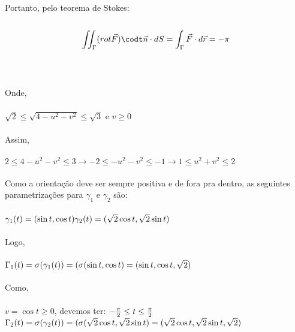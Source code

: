 \documentclass[11pt,a4paper]{article}
\newcommand{\integral}{\displaystyle\int}
\begin{document}
\begin{enumerate}
{{		                Portanto, pelo teorema de Stokes:\\\\
		                $$\iint_{\Gamma} (rot \vec{F})\codt \vec{n} \cdot dS = \integral_{\Gamma} \vec{F} \cdot d\vec{r} = -\pi$$\\\\
		                \item Onde,\\\\
		                $\sqrt{2} \leq \sqrt{4-u^2 - v^2} \leq \sqrt{3}$ e $v \geq 0$\\\\
		                Assim, \\\\
		                $2 \leq 4 - u^2 - v^2 \leq 3 \rightarrow -2\leq -u^2 -v^2 \leq -1 \rightarrow 1 \leq u^2 + v^2 \leq 2$\\\\
		                Como a orientação deve ser sempre positiva e de fora pra dentro, as seguintes parametrizações para $\gamma_{1}$ e $\gamma_{2}$ são:\\\\
		                $\gamma_{1}(t) = (\sin t,\cos t)\\\\
		                \gamma_{2}(t) = (\sqrt{2}\cos t,\sqrt{2}\sin t)$\\\\
		                Logo,\\\\
		                $\Gamma_{1}(t) = \sigma(\gamma_{1}(t))\\\\
		                =(\sigma(\sin t,\cos t)\\\\
		                =(\sin t,\cos t,\sqrt{2})$\\\\
		                Como,\\\\
		                $v = \cos t \geq 0$, devemos ter: $-\frac{\pi}{2} \leq t \leq \frac{\pi}{2}\\\\$
		                $\Gamma_{2}(t) = \sigma(\gamma_{2}(t))\\\\
		                =(\sigma(\sqrt{2}\cos t,\sqrt{2}\sin t)\\\\
		                =(\sqrt{2}\cos t,\sqrt{2}\sin t,\sqrt{2})$\\\\
}}
\end{enumerate}
\end{document}
